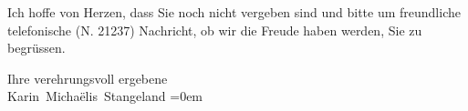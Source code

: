 \pstart
           {\pb}Ich hoffe von Herzen, dass Sie noch nicht vergeben sind
               und bitte um freundliche telefonische (N. 21237)  Nachricht, ob wir die Freude haben werden, Sie zu begrüssen.\pend
           
\pstart
           Ihre verehrungsvoll ergebene{\\[\baselineskip]}\spacefill\mbox{Karin Michaëlis Stangeland}\pend
           \leftskip=0em{}\endnumbering{}  
      